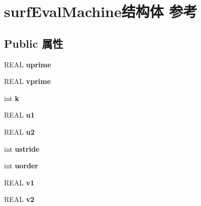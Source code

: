 \hypertarget{structsurf_eval_machine}{}\section{surf\+Eval\+Machine结构体 参考}
\label{structsurf_eval_machine}
\subsection*{Public 属性}
\begin{DoxyCompactItemize}
\item 
\mbox{\label{structsurf_eval_machine_a59894d7433c830609008d680af910715}} 
R\+E\+AL {\bfseries uprime}
\item 
\mbox{\label{structsurf_eval_machine_a3731837faadeaf238a4ac5bebf552a03}} 
R\+E\+AL {\bfseries vprime}
\item 
\mbox{\label{structsurf_eval_machine_aca7e0d04479d71dd2e6af162e050bcf6}} 
int {\bfseries k}
\item 
\mbox{\label{structsurf_eval_machine_a1899f79280799a08f9f64fb4e65e9b42}} 
R\+E\+AL {\bfseries u1}
\item 
\mbox{\label{structsurf_eval_machine_a5e9bcf56b559be4f5c76d9b158931a4e}} 
R\+E\+AL {\bfseries u2}
\item 
\mbox{\label{structsurf_eval_machine_aded62da64ae624cc32b0c039bdb48256}} 
int {\bfseries ustride}
\item 
\mbox{\label{structsurf_eval_machine_a207f94c696640fc8f3d94814aa0fc699}} 
int {\bfseries uorder}
\item 
\mbox{\label{structsurf_eval_machine_a12613544558cb62e992315fa429b14b9}} 
R\+E\+AL {\bfseries v1}
\item 
\mbox{\label{structsurf_eval_machine_ab52f00e9ea2b1bcd0acd8589e00ca3ef}} 
R\+E\+AL {\bfseries v2}
\item 
\mbox{\label{structsurf_eval_machine_a342074a5e1531d63fc4b0a90ef1aa9b4}} 

\end{DoxyCompactItemize}
